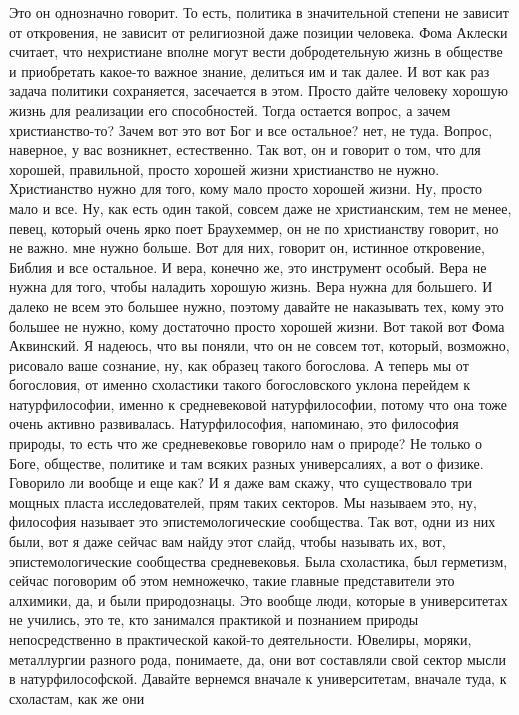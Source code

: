 Это он однозначно говорит. То есть, политика в значительной степени не зависит
от откровения, не зависит от религиозной даже позиции человека. Фома Аклески
считает, что нехристиане вполне могут вести добродетельную жизнь в обществе и
приобретать какое-то важное знание, делиться им и так далее. И вот как раз
задача политики сохраняется, засечается в этом. Просто дайте человеку хорошую
жизнь для реализации его способностей. Тогда остается вопрос, а зачем
христианство-то? Зачем вот это вот Бог и все остальное? нет, не туда. Вопрос,
наверное, у вас возникнет, естественно. Так вот, он и говорит о том, что для
хорошей, правильной, просто хорошей жизни христианство не нужно. Христианство
нужно для того, кому мало просто хорошей жизни. Ну, просто мало и все. Ну, как
есть один такой, совсем даже не христианским, тем не менее, певец, который очень
ярко поет Браухеммер, он не по христианству говорит, но не важно. мне нужно
больше. Вот для них, говорит он, истинное откровение, Библия и все остальное. И
вера, конечно же, это инструмент особый. Вера не нужна для того, чтобы наладить
хорошую жизнь. Вера нужна для большего. И далеко не всем это большее нужно,
поэтому давайте не наказывать тех, кому это большее не нужно, кому достаточно
просто хорошей жизни. Вот такой вот Фома Аквинский. Я надеюсь, что вы поняли,
что он не совсем тот, который, возможно, рисовало ваше сознание, ну, как образец
такого богослова. А теперь мы от богословия, от именно схоластики такого
богословского уклона перейдем к натурфилософии, именно к средневековой
натурфилософии, потому что она тоже очень активно развивалась. Натурфилософия,
напоминаю, это философия природы, то есть что же средневековье говорило нам о
природе? Не только о Боге, обществе, политике и там всяких разных универсалиях,
а вот о физике. Говорило ли вообще и еще как? И я даже вам скажу, что
существовало три мощных пласта исследователей, прям таких секторов. Мы называем
это, ну, философия называет это эпистемологические сообщества. Так вот, одни из
них были, вот я даже сейчас вам найду этот слайд, чтобы называть их, вот,
эпистемологические сообщества средневековья. Была схоластика, был герметизм,
сейчас поговорим об этом немножечко, такие главные представители это алхимики,
да, и были природознацы. Это вообще люди, которые в университетах не учились,
это те, кто занимался практикой и познанием природы непосредственно в
практической какой-то деятельности. Ювелиры, моряки, металлургии разного рода,
понимаете, да, они вот составляли свой сектор мысли в натурфилософской. Давайте
вернемся вначале к университетам, вначале туда, к схоластам, как же они

